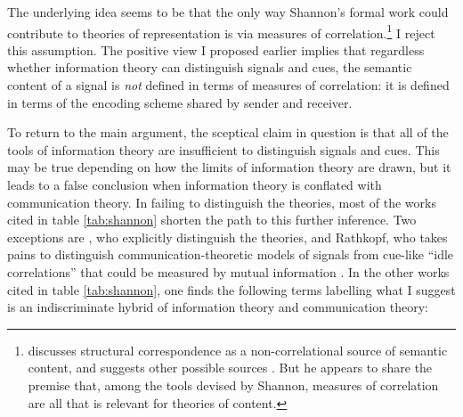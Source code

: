 \documentclass[12pt]{article}
\begin{document}


The underlying idea seems to be that the only way Shannon's formal work could contribute to theories of representation is via measures of correlation.\footnote{\citet[$\S$5]{shea2018representation} discusses structural correspondence as a non-correlational source of semantic content, and suggests other possible sources \citep[p. 76 n. 1]{shea2018representation}. But he appears to share the premise that, among the tools devised by Shannon, measures of correlation are all that is relevant for theories of content.}
I reject this assumption.
The positive view I proposed earlier implies that regardless whether information theory can distinguish signals and cues, the semantic content of a signal is \textit{not} defined in terms of measures of correlation: it is defined in terms of the encoding scheme shared by sender and receiver.

To return to the main argument, the sceptical claim in question is that all of the tools of information theory are insufficient to distinguish signals and cues.
This may be true depending on how the limits of information theory are drawn, but it leads to a false conclusion when information theory is conflated with communication theory.
In failing to distinguish the theories, most of the works cited in table \ref{tab:shannon} shorten the path to this further inference.
Two exceptions are \citet[17-20]{piccinini2011information}, who explicitly distinguish the theories, and Rathkopf, who takes pains to distinguish communication-theoretic models of signals from cue-like ``idle correlations'' that could be measured by mutual information \citep[p. 324 passim]{rathkopf2017neural}.
In the other works cited in table \ref{tab:shannon}, one finds the following terms labelling what I suggest is an indiscriminate hybrid of information theory and communication theory:
\end{document}
